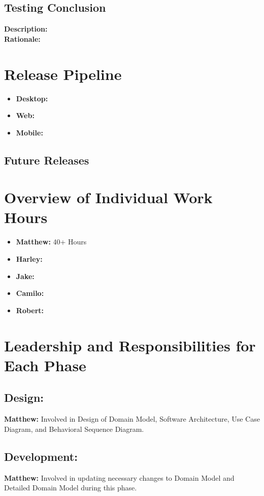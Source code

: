 \documentclass[12pt]{article}
\begin{document}
\subsection{Testing Conclusion}
\textbf{Description:}
\\
\textbf{Rationale:}


\section{Release Pipeline}
\begin{itemize}
	\item \textbf{Desktop:}
	\item \textbf{Web:}
	\item \textbf{Mobile:}
\end{itemize}

\subsection{Future Releases}

\section{Overview of Individual Work Hours}
\begin{itemize}
	\item \textbf{Matthew:} 40+ Hours
	\item \textbf{Harley:}
	\item \textbf{Jake:}
	\item \textbf{Camilo:}
	\item \textbf{Robert:}
\end{itemize}

\section{Leadership and Responsibilities for Each Phase}
\subsection{Design:}
\textbf{Matthew:} Involved in Design of Domain Model, Software Architecture, Use Case Diagram, and Behavioral Sequence Diagram. \\

\subsection{Development:}
\textbf{Matthew:} Involved in updating necessary changes to Domain Model and Detailed Domain Model during this phase.
\end{document}
